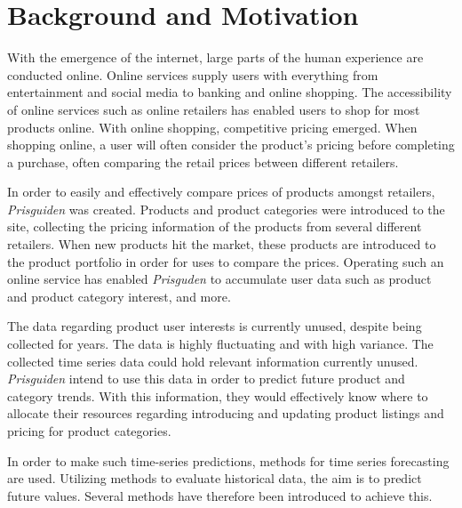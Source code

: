 \section{Background and Motivation}\label{cit}
\label{section:Introduction:BackgroundAndMotivation}


With the emergence of the internet, large parts of the human experience are conducted online.
Online services supply users with everything from entertainment and social media to banking and online shopping.
The accessibility of online services such as online retailers has enabled users to shop for most products online.
With online shopping, competitive pricing emerged.
When shopping online, a user will often consider the product's pricing before completing a purchase, often comparing the retail prices between different retailers.


In order to easily and effectively compare prices of products amongst retailers,
\textit{Prisguiden} was created.
Products and product categories were introduced to the site, collecting the pricing information of the products from several different retailers.
When new products hit the market, these products are introduced to the product portfolio in order for uses to compare the prices.
Operating such an online service has enabled \textit{Prisguden} to accumulate user data such as product and product category interest, and more.

The data regarding product user interests is currently unused, despite being collected for years.
The data is highly fluctuating and with high variance.
The collected time series data could hold relevant information currently unused.
\textit{Prisguiden} intend to use this data in order to predict future product and category trends.
With this information, they would effectively know where to allocate their resources regarding introducing and updating product listings and pricing for product categories.
\linebreak


In order to make such time-series predictions, methods for time series forecasting are used.
Utilizing methods to evaluate historical data, the aim is to predict future values.
Several methods have therefore been introduced to achieve this.

